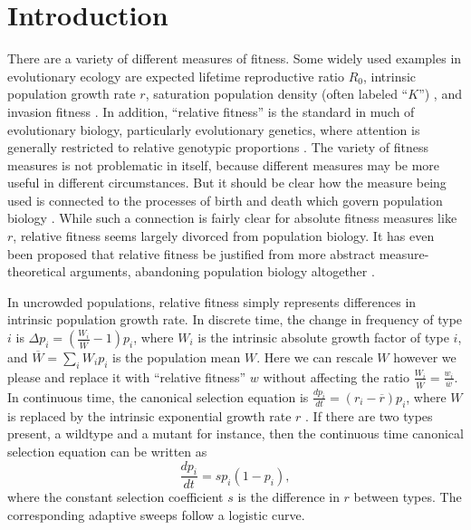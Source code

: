 \documentclass[11pt]{article}
\begin{document}
\newpage{}


\section*{Introduction}

There are a variety of different measures of fitness. Some widely used examples in evolutionary ecology are expected lifetime reproductive ratio $R_0$, intrinsic population growth rate $r$, saturation population density (often labeled ``$K$'') \citep{benton_2000}, and invasion fitness \citep{metz_1992}. In addition, ``relative fitness'' is the standard in much of evolutionary biology, particularly evolutionary genetics, where attention is generally restricted to relative genotypic proportions \cite[pp. 468]{barton_2007}. The variety of fitness measures is not problematic in itself, because different measures  may be more useful in different circumstances. But it should be clear how the measure being used is connected to the processes of birth and death which govern population biology \citep{metcalf_2007,doebeli_2017}. While such a connection is fairly clear for absolute fitness measures like $r$, relative fitness seems largely divorced from population biology. It has even been proposed that relative fitness be justified from more abstract measure-theoretical arguments, abandoning population biology altogether \citep{wagner_2010}.

In uncrowded populations, relative fitness simply represents differences in intrinsic population growth rate. In discrete time, the change in frequency of type $i$ is $\Delta p_i=\left(\frac{W_i}{\overline{W}}-1\right) p_i$, where $W_i$ is the intrinsic absolute growth factor of type $i$, and $\overline{W}=\sum_i W_i p_i$ is the population mean $W$. Here we can rescale $W$ however we please and replace it with ``relative fitness'' $w$ without affecting the ratio $\frac{W_i}{\overline{W}}=\frac{w_i}{\overline{w}}$. In continuous time, the canonical selection equation is $\frac{d p_i}{dt}=(r_i-\overline{r}) p_i$, where $W$ is replaced by the intrinsic exponential growth rate $r$ \citep[pp. 26]{crow_1970}. If there are two types present, a wildtype and a mutant for instance, then the continuous time canonical selection equation can be written as
\begin{equation}
\frac{d p_i}{dt}=s p_i(1-p_i), \label{eq:canonical}
\end{equation}
where the constant selection coefficient $s$ is the difference in $r$ between types. The corresponding adaptive sweeps follow a logistic curve. 
\end{document}
